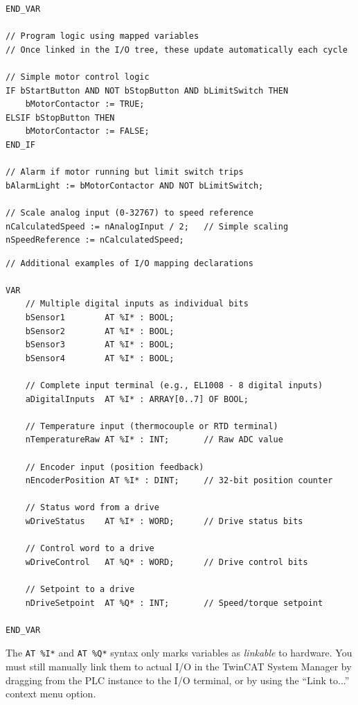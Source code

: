 \documentclass[11pt,a4paper]{article}
\begin{document}
\begin{lstlisting}
END_VAR

// Program logic using mapped variables
// Once linked in the I/O tree, these update automatically each cycle

// Simple motor control logic
IF bStartButton AND NOT bStopButton AND bLimitSwitch THEN
    bMotorContactor := TRUE;
ELSIF bStopButton THEN
    bMotorContactor := FALSE;
END_IF

// Alarm if motor running but limit switch trips
bAlarmLight := bMotorContactor AND NOT bLimitSwitch;

// Scale analog input (0-32767) to speed reference
nCalculatedSpeed := nAnalogInput / 2;   // Simple scaling
nSpeedReference := nCalculatedSpeed;
\end{lstlisting}

\begin{lstlisting}
// Additional examples of I/O mapping declarations

VAR
    // Multiple digital inputs as individual bits
    bSensor1        AT %I* : BOOL;
    bSensor2        AT %I* : BOOL;
    bSensor3        AT %I* : BOOL;
    bSensor4        AT %I* : BOOL;
    
    // Complete input terminal (e.g., EL1008 - 8 digital inputs)
    aDigitalInputs  AT %I* : ARRAY[0..7] OF BOOL;
    
    // Temperature input (thermocouple or RTD terminal)
    nTemperatureRaw AT %I* : INT;       // Raw ADC value
    
    // Encoder input (position feedback)
    nEncoderPosition AT %I* : DINT;     // 32-bit position counter
    
    // Status word from a drive
    wDriveStatus    AT %I* : WORD;      // Drive status bits
    
    // Control word to a drive
    wDriveControl   AT %Q* : WORD;      // Drive control bits
    
    // Setpoint to a drive
    nDriveSetpoint  AT %Q* : INT;       // Speed/torque setpoint
    
END_VAR
\end{lstlisting}

\begin{warningbox}
The \texttt{AT \%I*} and \texttt{AT \%Q*} syntax only marks variables as \textit{linkable} to hardware. You must still manually link them to actual I/O in the TwinCAT System Manager by dragging from the PLC instance to the I/O terminal, or by using the ``Link to...'' context menu option.
\end{warningbox}
\end{document}
